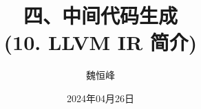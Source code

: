\documentclass[]{beamer}
\title[中间代码生成]{四、中间代码生成 \\ (10. LLVM IR 简介)}
\author[魏恒峰]{\large 魏恒峰}
\institute{hfwei@nju.edu.cn}
\date{2024年04月26日}
\begin{document}
\maketitle




\thankyou{}

\end{document}
